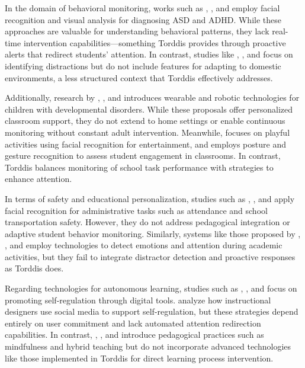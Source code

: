 			In the domain of behavioral monitoring, works such as \cite{Akter2021}, \cite{Pelc2006}, and \cite{Albrecht2014} employ facial recognition and visual analysis for diagnosing ASD and ADHD. While these approaches are valuable for understanding behavioral patterns, they lack real-time intervention capabilities—something Torddis provides through proactive alerts that redirect students' attention. In contrast, studies like \cite{Campbell2015Using}, \cite{Ucar2022Recognizing}, and \cite{Argel2023Intellitell} focus on identifying distractions but do not include features for adapting to domestic environments, a less structured context that Torddis effectively addresses.
			
			Additionally, research by \cite{Berrezueta-Guzman2021}, \cite{VilliersRader2021}, and \cite{Washington2016AWereable} introduces wearable and robotic technologies for children with developmental disorders. While these proposals offer personalized classroom support, they do not extend to home settings or enable continuous monitoring without constant adult intervention. Meanwhile, \cite{Muller2018ArchnSmile} focuses on playful activities using facial recognition for entertainment, and \cite{Nguyen2019} employs posture and gesture recognition to assess student engagement in classrooms. In contrast, Torddis balances monitoring of school task performance with strategies to enhance attention.
			
			In terms of safety and educational personalization, studies such as \cite{Hachad2020}, \cite{James2019}, and \cite{Boumiza2017} apply facial recognition for administrative tasks such as attendance and school transportation safety. However, they do not address pedagogical integration or adaptive student behavior monitoring. Similarly, systems like those proposed by \cite{DaCosta2023}, \cite{Kumar2024Zoom}, and \cite{Narkhede2023} employ technologies to detect emotions and attention during academic activities, but they fail to integrate distractor detection and proactive responses as Torddis does.
			
			Regarding technologies for autonomous learning, studies such as \cite{Bembich2016Future}, \cite{Roberts2020Task}, and \cite{Peters2003Self} focus on promoting self-regulation through digital tools. \cite{Muljana2022Instructional} analyze how instructional designers use social media to support self-regulation, but these strategies depend entirely on user commitment and lack automated attention redirection capabilities. In contrast, \cite{Palmer2022impact}, \cite{Adcroft2018Developing}, and \cite{Salter2014Exploring} introduce pedagogical practices such as mindfulness and hybrid teaching but do not incorporate advanced technologies like those implemented in Torddis for direct learning process intervention.
			
